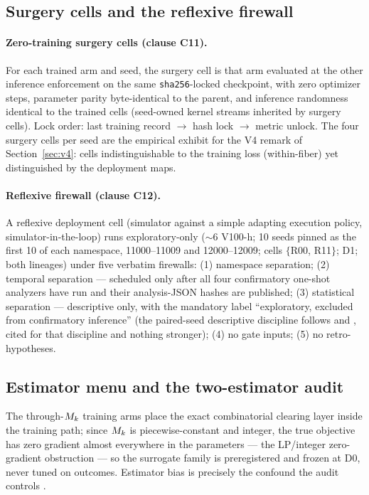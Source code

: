 \subsection{Surgery cells and the reflexive firewall}
\label{sec:cube-surgery}

\paragraph{Zero-training surgery cells (clause C11).}
For each trained arm and seed, the surgery cell is that arm evaluated at the
other inference enforcement on the same \texttt{sha256}-locked checkpoint,
with zero optimizer steps, parameter parity byte-identical to the parent, and
inference randomness identical to the trained cells (seed-owned kernel
streams inherited by surgery cells). Lock order: last training record
$\to$ hash lock $\to$ metric unlock. The four surgery cells per seed are the
empirical exhibit for the V4 remark of Section~\ref{sec:v4}: cells
indistinguishable to the training loss (within-fiber) yet distinguished by
the deployment maps.

\paragraph{Reflexive firewall (clause C12).}
A reflexive deployment cell (simulator against a simple adapting execution
policy, simulator-in-the-loop) runs exploratory-only (${\sim}6$ V100-h; 10
seeds pinned as the first 10 of each namespace, 11000--11009 and
12000--12009; cells $\{$R00, R11$\}$; D1; both lineages) under five verbatim
firewalls: (1) namespace separation; (2) temporal separation --- scheduled
only after all four confirmatory one-shot analyzers have run and their
analysis-JSON hashes are published; (3) statistical separation --- descriptive
only, with the mandatory label ``exploratory, excluded from confirmatory
inference'' (the paired-seed descriptive discipline follows
\citealt{trades2025} and \citealt{dexclosedloop2026}, cited for that
discipline and nothing stronger); (4) no gate inputs; (5) no
retro-hypotheses.

\subsection{Estimator menu and the two-estimator audit}
\label{sec:cube-estimators}

The through-$M_k$ training arms place the exact combinatorial clearing layer
inside the training path; since $M_k$ is piecewise-constant and integer, the
true objective has zero gradient almost everywhere in the parameters --- the
LP/integer zero-gradient obstruction \citep{surrogateldfl2025} --- so the
surrogate family is preregistered and frozen at D0, never tuned on outcomes.
Estimator bias is precisely the confound the audit controls
\citep{diffsimpolicy2026}.

